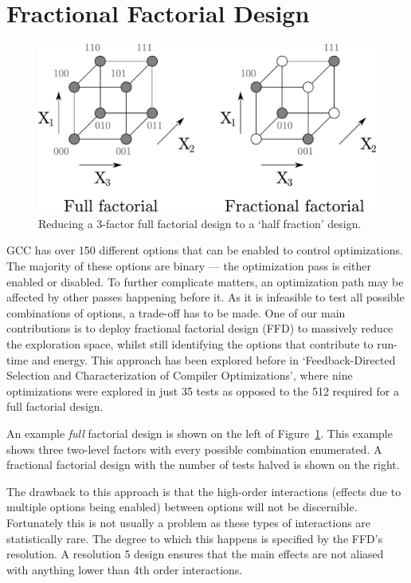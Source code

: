 \documentclass[twocolumn]{article}
\let\oldcaption\caption
\renewcommand{\caption}[1]{\oldcaption{\textup{#1}}}
\begin{document}
\section{Fractional Factorial Design}

\begin{figure}[bt]
	\centering
	\includegraphics[width=0.9\linewidth]{ffd.pdf}
	\caption{Reducing a 3-factor full factorial design to a `half fraction' design.}
	\label{Fig:FFDTut}
\end{figure}

GCC has over 150 different options that can be enabled to control optimizations. The majority of these options are binary --- the optimization pass is either enabled or disabled. To further complicate matters, an optimization path may be affected by other passes happening before it. As it is infeasible to test all possible combinations of options, a trade-off has to be made. One of our main contributions is to deploy fractional factorial design (FFD) to massively reduce the exploration space, whilst still identifying the options that contribute to run-time and energy. This approach has been explored before in `Feedback-Directed Selection and Characterization of Compiler Optimizations'\cite{IntelPaper}, where nine optimizations were explored in just 35 tests as opposed to the 512 required for a full factorial design.

An example \textit{full} factorial design is shown on the left of Figure~\ref{Fig:FFDTut}. This example shows three two-level factors with every possible combination enumerated. A fractional factorial design with the number of tests halved is shown on the right.

The drawback to this approach is that the high-order interactions (effects due to multiple options being enabled) between options will not be discernible. Fortunately this is not usually a problem as these types of interactions are statistically rare. The degree to which this happens is specified by the FFD's resolution. A resolution 5 design ensures that the main effects are not aliased with anything lower than 4th order interactions.
\end{document}

